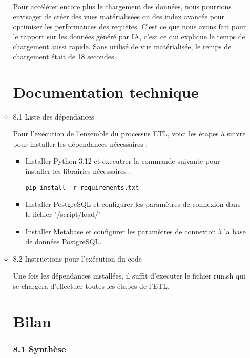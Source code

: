 \begin{itemize}
\begin{itemize}
Pour accélérer encore plus le chargement des données, nous pourrions envisager de créer des vues matérialisées ou des index avancés pour optimiser les performances des requêtes.
C'est ce que nous avons fait pour le rapport sur les données généré par IA, c'est ce qui explique le temps de chargement aussi rapide.
Sans utilisé de vue matérialisée, le temps de chargement était de 18 secondes.



\chapter*{Documentation technique}



\item 8.1 Liste des dépendances

Pour l’exécution de l'ensemble du processus ETL, voici les étapes à suivre pour installer les dépendances nécessaires :

\begin{itemize}
\item Installer Python 3.12 et executrer la commande suivante pour installer les librairies nécessaires :

\begin{verbatim}
pip install -r requirements.txt
\end{verbatim}

\item Installer PostgreSQL et configurer les paramètres de connexion dans le fichier "/script/load/"

\item Installer Metabase et configurer les paramètres de connexion à la base de données PostgreSQL.
\end{itemize}


\item 8.2 Instructions pour l’exécution du code

Une fois les dépendances installées, il suffit d'executer le fichier run.sh qui se chargera d'effectuer toutes les étapes de l'ETL.


\chapter*{Bilan}

\subsection{8.1 Synthèse}


\end{itemize}
\end{itemize}
